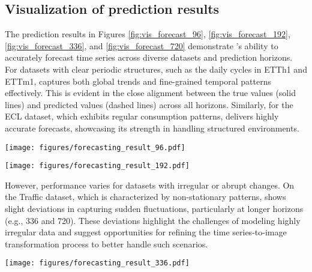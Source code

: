 \subsection{Visualization of prediction results}

The prediction results in Figures \ref{fig:vis_forecast_96}, \ref{fig:vis_forecast_192}, \ref{fig:vis_forecast_336}, and \ref{fig:vis_forecast_720} demonstrate \method's ability to accurately forecast time series across diverse datasets and prediction horizons. For datasets with clear periodic structures, such as the daily cycles in ETTh1 and ETTm1, \method captures both global trends and fine-grained temporal patterns effectively. This is evident in the close alignment between the true values (solid lines) and predicted values (dashed lines) across all horizons. Similarly, for the ECL dataset, which exhibits regular consumption patterns, \method delivers highly accurate forecasts, showcasing its strength in handling structured environments.

\begin{figure*}[h!]
    \centering
    \texttt{[image: figures/forecasting\_result\_96.pdf]}
    \caption{Prediction results visualization for ETTh1, ETTm1, ECL, and Traffic datasets at 96 prediction lengths. True values (solid line) and predicted values (dashed line) are shown for each dataset and horizon.}
    \label{fig:vis_forecast_96}
\end{figure*}

\begin{figure*}[h!]
    \centering
    \texttt{[image: figures/forecasting\_result\_192.pdf]}
    \caption{Prediction results visualization for ETTh1, ETTm1, ECL, and Traffic datasets at 192 prediction lengths. True values (solid line) and predicted values (dashed line) are shown for each dataset and horizon.}
    \label{fig:vis_forecast_192}
\end{figure*}

However, performance varies for datasets with irregular or abrupt changes. On the Traffic dataset, which is characterized by non-stationary patterns, \method shows slight deviations in capturing sudden fluctuations, particularly at longer horizons (e.g., 336 and 720). These deviations highlight the challenges of modeling highly irregular data and suggest opportunities for refining the time series-to-image transformation process to better handle such scenarios.

\begin{figure*}[h!]
    \centering
    \texttt{[image: figures/forecasting\_result\_336.pdf]}
    \caption{Prediction results visualization for ETTh1, ETTm1, ECL, and Traffic datasets at 336 prediction lengths. True values (solid line) and predicted values (dashed line) are shown for each dataset and horizon.}
    \label{fig:vis_forecast_336}
\end{figure*}


